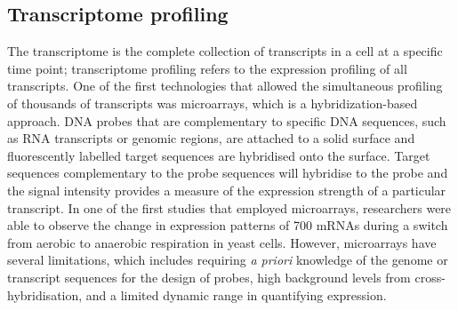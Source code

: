 \subsection{Transcriptome profiling}

The transcriptome is the complete collection of transcripts in a cell at a specific time point; transcriptome profiling refers to the expression profiling of all transcripts. One of the first technologies that allowed the simultaneous profiling of thousands of transcripts was microarrays\cite{pmid7569999}, which is a hybridization-based approach. DNA probes that are complementary to specific DNA sequences, such as RNA transcripts or genomic regions, are attached to a solid surface and fluorescently labelled target sequences are hybridised onto the surface. Target sequences complementary to the probe sequences will hybridise to the probe and the signal intensity provides a measure of the expression strength of a particular transcript. In one of the first studies that employed microarrays, researchers were able to observe the change in expression patterns of 700 mRNAs during a switch from aerobic to anaerobic respiration in yeast cells\cite{pmid9381177}. However, microarrays have several limitations, which includes requiring \textit{a priori} knowledge of the genome or transcript sequences for the design of probes, high background levels from cross-hybridisation\cite{pmid16749918}, and a limited dynamic range in quantifying expression.

